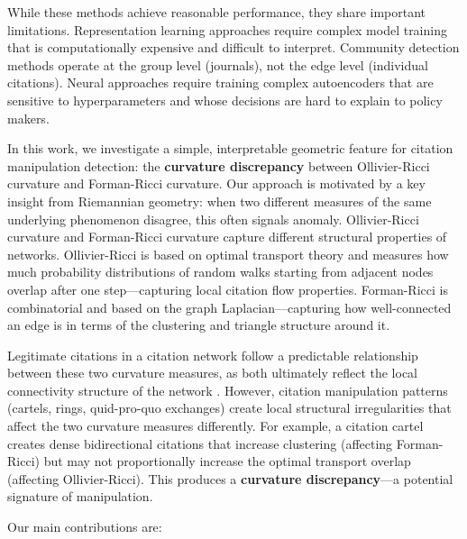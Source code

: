 \documentclass[11pt,letterpaper]{article}
\begin{document}
While these methods achieve reasonable performance, they share important limitations. Representation learning approaches require complex model training that is computationally expensive and difficult to interpret. Community detection methods operate at the group level (journals), not the edge level (individual citations). Neural approaches require training complex autoencoders that are sensitive to hyperparameters and whose decisions are hard to explain to policy makers.

In this work, we investigate a simple, interpretable geometric feature for citation manipulation detection: the \textbf{curvature discrepancy} between Ollivier-Ricci curvature and Forman-Ricci curvature. Our approach is motivated by a key insight from Riemannian geometry: when two different measures of the same underlying phenomenon disagree, this often signals anomaly. Ollivier-Ricci curvature \cite{Ollivier2009} and Forman-Ricci curvature \cite{Forman2003} capture different structural properties of networks. Ollivier-Ricci is based on optimal transport theory and measures how much probability distributions of random walks starting from adjacent nodes overlap after one step---capturing local citation flow properties. Forman-Ricci is combinatorial and based on the graph Laplacian---capturing how well-connected an edge is in terms of the clustering and triangle structure around it.

Legitimate citations in a citation network follow a predictable relationship between these two curvature measures, as both ultimately reflect the local connectivity structure of the network \cite{Samal2018}. However, citation manipulation patterns (cartels, rings, quid-pro-quo exchanges) create local structural irregularities that affect the two curvature measures differently. For example, a citation cartel creates dense bidirectional citations that increase clustering (affecting Forman-Ricci) but may not proportionally increase the optimal transport overlap (affecting Ollivier-Ricci). This produces a \textbf{curvature discrepancy}---a potential signature of manipulation.

Our main contributions are:
\end{document}
